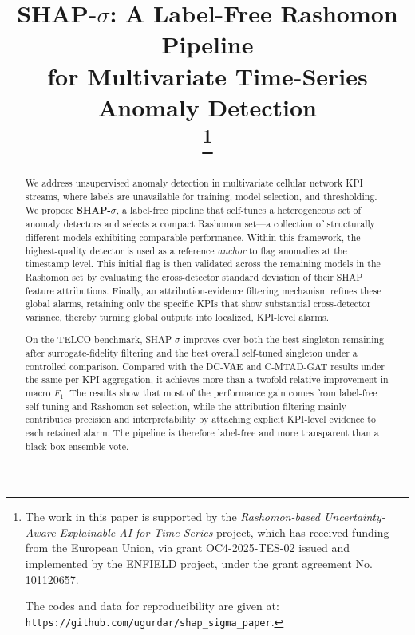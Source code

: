 \documentclass[conference]{IEEEtran}
\begin{document}
\title{SHAP-$\sigma$: A Label-Free Rashomon Pipeline\\for Multivariate Time-Series Anomaly Detection\\
\thanks{The work in this paper is supported by the \textit{Rashomon-based Uncertainty-Aware Explainable AI for Time Series} project, which has received funding from the European Union, via grant OC4-2025-TES-02 issued and implemented by the ENFIELD project, under the grant agreement No. 101120657.

The codes and data for reproducibility are given at: \texttt{https://github.com/ugurdar/shap\_sigma\_paper}.}
}

\author{
}

\maketitle

\begin{abstract}
We address unsupervised anomaly detection in multivariate cellular network KPI streams, where labels are unavailable for training, model selection, and thresholding. We propose \textbf{SHAP-$\sigma$}, a label-free pipeline that self-tunes a heterogeneous set of anomaly detectors and selects a compact Rashomon set---a collection of structurally different models exhibiting comparable performance. Within this framework, the highest-quality detector is used as a reference \textit{anchor} to flag anomalies at the timestamp level. This initial flag is then validated across the remaining models in the Rashomon set by evaluating the cross-detector standard deviation of their SHAP feature attributions. Finally, an attribution-evidence filtering mechanism refines these global alarms, retaining only the specific KPIs that show substantial cross-detector variance, thereby turning global outputs into localized, KPI-level alarms.

On the TELCO benchmark, SHAP-$\sigma$ improves over both the best singleton remaining after surrogate-fidelity filtering and the best overall self-tuned singleton under a controlled comparison. Compared with the DC-VAE and C-MTAD-GAT results under the same per-KPI aggregation, it achieves more than a twofold relative improvement in macro $F_1$. The results show that most of the performance gain comes from label-free self-tuning and Rashomon-set selection, while the attribution filtering mainly contributes precision and interpretability by attaching explicit KPI-level evidence to each retained alarm. The pipeline is therefore label-free and more transparent than a black-box ensemble vote.
\end{abstract}
\end{document}
